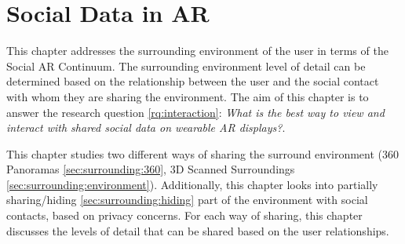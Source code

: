 \chapter{Social Data in AR} %
\label{ch:data} %

This chapter addresses the surrounding environment of the user in terms of the Social AR Continuum. The surrounding environment level of detail can be determined based on the relationship between the user and the social contact with whom they are sharing the environment. The aim of this chapter is to answer the research question \ref{rq:interaction}: \textit{What is the best way to view and interact with shared social data on wearable AR displays?}. 


This chapter studies two different ways of sharing the surround environment (360 Panoramas \ref{sec:surrounding:360}, 3D Scanned Surroundings \ref{sec:surrounding:environment}). Additionally, this chapter looks into partially sharing/hiding \ref{sec:surrounding:hiding} part of the environment with social contacts, based on privacy concerns. For each way of sharing, this chapter discusses the levels of detail that can be shared based on the user relationships. 





